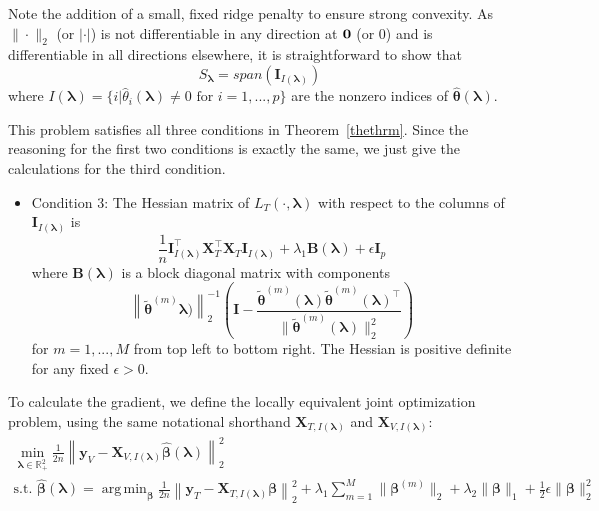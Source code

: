 \documentclass[12pt,letterpaper]{article}
\DeclareMathOperator*{\argmin}{arg\,min}
\begin{document}
Note the addition of a small, fixed ridge penalty to ensure strong convexity. As $\|\cdot\|_2$ (or $|\cdot|$) is not differentiable in any direction at ${\bf 0}$ (or $0$) and is differentiable in all directions elsewhere, it is straightforward to show that 
\begin{equation}
S_{\boldsymbol \lambda} = span(\boldsymbol I_{I(\boldsymbol\lambda)})
\end{equation}
where $I(\boldsymbol\lambda) = \{i | \hat{\theta}_i(\boldsymbol\lambda) \ne 0 \text{ for } i=1,...,p \}$ are the nonzero indices of $\hat{\boldsymbol{\theta}}(\boldsymbol{\lambda})$. 

This problem satisfies all three conditions in Theorem~\ref{thethrm}. Since the reasoning for the first two conditions is exactly the same, we just give the calculations for the third condition.

\begin{itemize}
\item[] Condition 3: The Hessian matrix of $L_T(\cdot, \boldsymbol{\lambda})$ with respect to the columns of $\boldsymbol I_{I(\boldsymbol \lambda)}$ is
\begin{equation}
\frac{1}{n} \boldsymbol I_{I(\boldsymbol \lambda)}^\top \boldsymbol{X}_{T}^\top \boldsymbol{X}_{T} \boldsymbol I_{I(\boldsymbol \lambda)}
+ \lambda_1 \boldsymbol{B}(\boldsymbol\lambda)
+ \epsilon \boldsymbol I_p
\end{equation}
where $\boldsymbol{B}(\boldsymbol\lambda)$ is a block diagonal matrix with components 
\begin{equation}
\left \| \tilde{\boldsymbol{\theta}}^{(m)}
\boldsymbol{\lambda})\right\|_2^{-1} 
\left (
\boldsymbol{I} - 
\frac{\tilde{\boldsymbol{\theta}}^{(m)}(\boldsymbol{\lambda})\tilde{\boldsymbol{\theta}}^{(m)}(\boldsymbol{\lambda})^\top}{\|\tilde{\boldsymbol{\theta}}^{(m)}(\boldsymbol{\lambda})\|_2^2}
\right)
\end{equation}
for $m=1,...,M$ from top left to bottom right. The Hessian is positive definite for any fixed $\epsilon > 0$.
\hfill {}
\end{itemize}

To calculate the gradient, we define the locally equivalent joint optimization problem, using the same notational shorthand $\boldsymbol{X}_{T, I(\boldsymbol\lambda)}$ and $\boldsymbol{X}_{V, I(\boldsymbol\lambda)}$:
\begin{equation}
\begin{array}{c}
\min_{\boldsymbol{\lambda} \in \mathbb{R}^2_{+}} \frac{1}{2n} \left \| \boldsymbol{y}_V - \boldsymbol X_{V,I(\boldsymbol\lambda)} \hat{\boldsymbol\beta}(\boldsymbol{\lambda}) \right \|^2_2 \\
\text{s.t. }
\hat{\boldsymbol{\beta}}(\boldsymbol{\lambda}) = \argmin_{\boldsymbol \beta}
\frac{1}{2n} \left \| \boldsymbol{y}_T - \boldsymbol{X}_{T, I(\boldsymbol\lambda)} \boldsymbol \beta \right \|^2_2
+ \lambda_1 \sum_{m=1}^M \| \boldsymbol \beta^{(m)} \|_2
+ \lambda_2 \| \boldsymbol \beta \|_1
+ \frac{1}{2}\epsilon \| \boldsymbol \beta \|_2^2
\end{array}
\end{equation}
\end{document}
